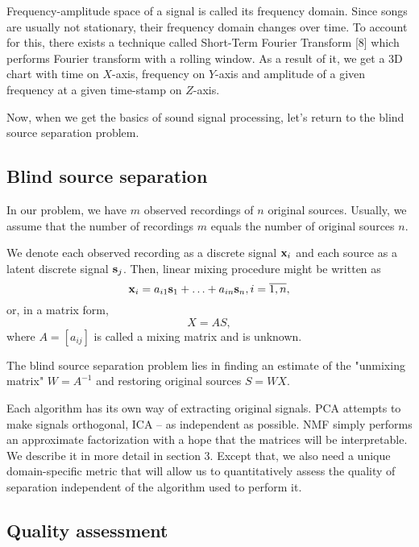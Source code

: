 \documentclass[../main.tex]{subfiles} %
\begin{document}
Frequency-amplitude space of a signal is called its frequency domain. Since songs are usually not stationary, their frequency domain changes over time. To account for this, there exists a technique called Short-Term Fourier Transform [8] which performs Fourier transform with a rolling window. As a result of it, we get a 3D chart with time on $X$-axis, frequency on $Y$-axis and amplitude of a given frequency at a given time-stamp on $Z$-axis.

Now, when we get the basics of sound signal processing, let's return to the blind source separation problem.

\subsection{Blind source separation}

In our problem, we have $m$ observed recordings of $n$ original sources. Usually, we assume that the number of recordings $m$ equals the number of original sources $n$.

We denote each observed recording as a discrete signal ${\mathbf x}_i$ and each source as a latent discrete signal ${\mathbf s}_j$. Then, linear mixing procedure might be written as 
\[ {\mathbf x}_i = a_{i1} {\mathbf s}_1 + \ldots + a_{in} {\mathbf s}_n, i = \overline{1, n}, \]
or, in a matrix form, 
\[ X = A S, \]
where $A = \left[a_{ij} \right]$ is called a mixing matrix and is unknown. 

The blind source separation problem lies in finding an estimate of the "unmixing matrix" $W = A^{-1}$  and restoring original sources $S = W X$. 

Each algorithm has its own way of extracting original signals. PCA attempts to make signals orthogonal, ICA -- as independent as possible. NMF simply performs an approximate factorization with a hope that the matrices will be interpretable. We describe it in more detail in section 3. Except that, we also need a unique domain-specific metric that will allow us to quantitatively assess the quality of separation independent of the algorithm used to perform it.

\subsection{Quality assessment}




\end{document}
